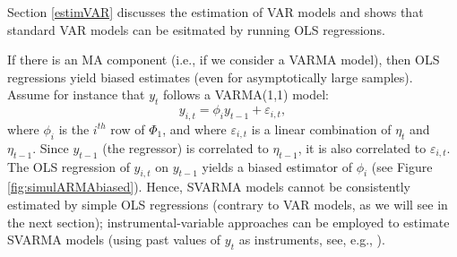 \documentclass[
  12pt,
]{book}
\theoremstyle{definition}
\theoremstyle{definition}
\theoremstyle{definition}
\theoremstyle{definition}
\theoremstyle{remark}
\begin{document}
Section \ref{estimVAR} discusses the estimation of VAR models and shows that standard VAR models can be esitmated by running OLS regressions.

If there is an MA component (i.e., if we consider a VARMA model), then OLS regressions yield biased estimates (even for asymptotically large samples). Assume for instance that \(y_t\) follows a VARMA(1,1) model:
\[
y_{i,t} = \phi_i y_{t-1} + \varepsilon_{i,t},
\]
where \(\phi_i\) is the \(i^{th}\) row of \(\Phi_1\), and where \(\varepsilon_{i,t}\) is a linear combination of \(\eta_t\) and \(\eta_{t-1}\). Since \(y_{t-1}\) (the regressor) is correlated to \(\eta_{t-1}\), it is also correlated to \(\varepsilon_{i,t}\). The OLS regression of \(y_{i,t}\) on \(y_{t-1}\) yields a biased estimator of \(\phi_i\) (see Figure \ref{fig:simulARMAbiased}). Hence, SVARMA models cannot be consistently estimated by simple OLS regressions (contrary to VAR models, as we will see in the next section); instrumental-variable approaches can be employed to estimate SVARMA models (using past values of \(y_t\) as instruments, see, e.g., \citet{Gourieroux_Monfort_Renne_2020}).
\end{document}
